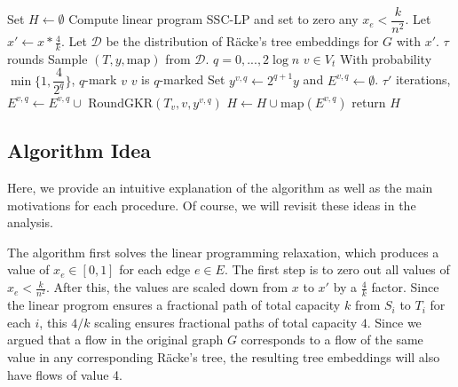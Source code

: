 \documentclass[12pt]{article}
\begin{document}
\begin{codebox}
\li Set $H \leftarrow \emptyset$
\li Compute linear program SSC-LP and set to zero any $x_e < \dfrac{k}{n^2}$.
\li Let $x' \leftarrow x*\frac{4}{k}$. 
\li Let $\mathcal{D}$ be the distribution of R\"{a}cke's tree embeddings for $G$ with $x'$.
\li \For $\tau$ rounds \Do
\li Sample $(T, y, \text{map})$ from $\mathcal{D}$. 
\li \For $q = 0, ..., 2\log n$ \Do
\li \For $v \in V_t$ \Do
\li With probability $\min\{1, \dfrac{4}{2^q}\}$, $q$-mark $v$
\li \If $v$ is $q$-marked \Then
\li Set $y^{v, q}\leftarrow 2^{q+1}y$ and $E^{v,q} \leftarrow \emptyset$.
\li \For $\tau'$ iterations, \Do
\li $E^{v,q} \leftarrow E^{v,q} \cup$ RoundGKR$(T_v, v, y^{v,q})$ \End
\li $H \leftarrow H \cup \text{map}(E^{v,q})$ \End \End \End \End
\li return $H$
\end{codebox}

\subsection{Algorithm Idea}

Here, we provide an intuitive explanation of the algorithm as well as the main motivations for each procedure. Of course, we will revisit these ideas in the analysis.

The algorithm first solves the linear programming relaxation, which produces a value of $x_e \in [0,1]$ for each edge $e \in E$. The first step is to zero out all values of $x_e < \frac{k}{n^2}$. After this, the values are scaled down from $x$ to $x'$ by a $\frac{4}{k}$ factor. Since the linear progrom ensures a fractional path of total capacity $k$ from $S_i$ to $T_i$ for each $i$, this $4/k$ scaling ensures fractional paths of total capacity $4$. Since we argued that a flow in the original graph $G$ corresponds to a flow of the same value in any corresponding R\"{a}cke's tree, the resulting tree embeddings will also have flows of value 4. 
\end{document}

